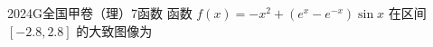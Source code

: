 
\begin{problem}{2024}{G}{全国甲卷（理）}{7}{函数}
函数 $f(x)=-x^2+(e^x-e^{-x})\sin x$ 在区间 $[-2.8,2.8]$ 的大致图像为
\begin{choices}
\choice{{\hspace{1cm}}}
\choice{{\hspace{1cm}}}
\choice{{\hspace{1cm}}}
\choice{{\hspace{1cm}}}
\end{choices}
\end{problem}